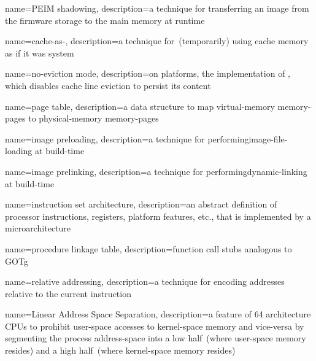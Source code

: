 {
  name={\gls{PEIM} shadowing},
  description={a technique for transferring an  \gls{image} from the \gls{firmware} storage to the main memory at runtime}
}

{
  name={cache-as-},
  description={a technique for~(temporarily) using cache memory as if it was system }
}

{
  name={no-eviction mode},
  description={on  platforms, the implementation of , which disables cache line eviction to persist its content}
}

{
  name={page table},
  description={a data structure to map \gls{virtual-memory} \glspl{memory-page} to \gls{physical-memory} \glspl{memory-page}}
}

{
  name={\gls{image} preloading},
  description={a technique for performing\gls{image-file-loading} at build-time}
}

{
  name={\gls{image} prelinking},
  description={a technique for performing\gls{dynamic-linking} at build-time}
}

{
  name={instruction set architecture},
  description={an abstract definition of processor instructions, registers, platform features, etc., that is implemented by a microarchitecture}
}


{
  name={procedure linkage table},
  description={function call stubs analogous to \gls{GOTg}}
}

{
  name={relative addressing},
  description={a technique for encoding addresses relative to the current  instruction}
}

{
  name={Linear Address Space Separation},
  description={a feature of  64 architecture \glspl{CPU} to prohibit \gls{user-space} accesses to \gls{kernel-space} memory and vice-versa by segmenting the process \gls{address-space} into a low half~(where \gls{user-space} memory resides) and a high half~(where \gls{kernel-space} memory resides)}
}

